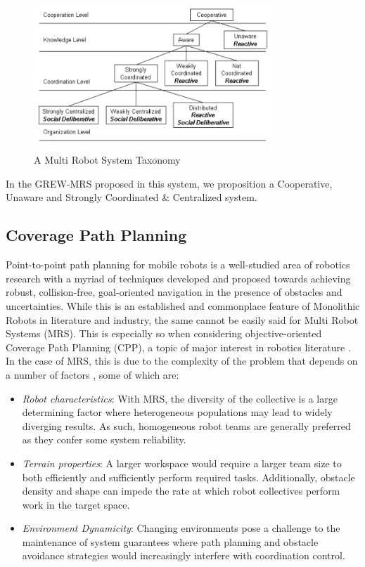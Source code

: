 \documentclass{report}
\begin{document}
\begin{figure}[h]
	\centering
	\includegraphics[width=0.8\textwidth]{images/MRS_taxonomy.png}
	\caption{A Multi Robot System Taxonomy \cite{Iocchi2001}}
	\label{fig:MRS_taxonomy}
\end{figure}

In the GREW-MRS proposed in this system, we proposition a Cooperative, Unaware and Strongly Coordinated \& Centralized system.

\newpage

\subsection{Coverage Path Planning}
Point-to-point path planning for mobile robots is a well-studied area of robotics research with a myriad of techniques developed and proposed towards achieving robust, collision-free, goal-oriented navigation in the presence of obstacles and uncertainties. While this is an established and commonplace feature of Monolithic Robots in literature and industry, the same cannot be easily said for Multi Robot Systems (MRS). This is especially so when considering objective-oriented Coverage Path Planning (CPP), a topic of major interest in robotics literature \cite{Macas2009}. In the case of MRS, this is due to the complexity of the problem that depends on a number of factors \cite{Yan2014}, some of which are:
\begin{itemize}
 \item \textit{Robot characteristics}: With MRS, the diversity of the collective is a large determining factor where heterogeneous populations may lead to widely diverging results. As such, homogeneous robot teams are generally preferred as they confer some system reliability.
 \item \textit{Terrain properties}: A larger workspace would require a larger team size to both efficiently and sufficiently perform required tasks. Additionally, obstacle density and shape can impede the rate at which robot collectives perform work in the target space.
 \item \textit{Environment Dynamicity}: Changing environments pose a challenge to the maintenance of system guarantees where path planning and obstacle avoidance strategies would increasingly interfere with coordination control.
\end{itemize}
\end{document}
